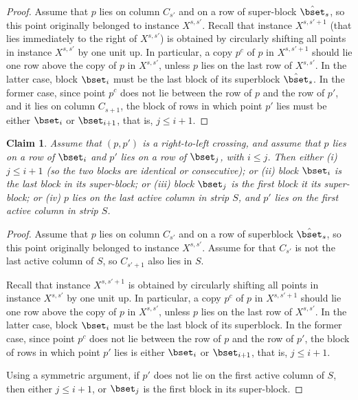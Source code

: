 \documentclass[11pt]{article}
\numberwithin{equation}{section}
\newtheorem{claim}[theorem]{Claim}
\theoremstyle{definition}
\theoremstyle{plain}
\begin{document}
\begin{proof}
Assume that $p$ lies on column $C_{s'}$ and on a row of super-block $\hat\bset_s$, so this point originally belonged to instance $X^{s,s'}$. Recall that instance $X^{s,s'+1}$  (that lies immediately to the right of $X^{s,s'}$) is obtained by circularly shifting all points in instance $X^{s,s'}$ by one unit up. In particular, a copy $p^c$ of $p$ in $X^{s,s'+1}$ should lie one row above the copy of $p$ in $X^{s,s'}$, unless $p$ lies on the last row of $X^{s,s'}$. In the latter case, block $\bset_i$ must be the last block of its superblock $\hat \bset_s$. In the former case, since point $p^c$ does not lie between the row of $p$ and the row of $p'$, and it lies on column $C_{s+1}$, the block of rows in which point $p'$ lies must be either $\bset_i$ or $\bset_{i+1}$, that is, $j\leq i+1$.
\end{proof}

\begin{claim}\label{claim: right to left crossing}
	Assume that $(p,p')$ is a right-to-left crossing, and assume that $p$ lies on a row of $\bset_i$ and $p'$ lies on a row of $\bset_j$, with $i\leq j$. Then either (i) $j\leq i+1$ (so the two blocks are identical or consecutive); or (ii) block $\bset_i$ is the last block in its super-block; or (iii) block $\bset_j$ is the first block it its super-block; or (iv) $p$ lies on the last active column in strip $S$, and $p'$ lies on the first active column in strip $S$.
\end{claim}

\begin{proof}
	Assume that $p$ lies on column $C_{s'}$ and on a row of superblock $\hat \bset_s$, so this point originally belonged to instance $X^{s,s'}$. 
	Assume for that $C_{s'}$ is not the last active column of $S$, so $C_{s'+1}$ also lies in $S$. 
	
	Recall that instance $X^{s,s'+1}$ is obtained by circularly shifting all points in instance $X^{s,s'}$ by one unit up. In particular, a copy $p^c$ of $p$ in $X^{s,s'+1}$ should lie one row above the copy of $p$ in $X^{s,s'}$, unless $p$ lies on the last row of $X^{s,s'}$. In the latter case, block $\bset_i$ must be the last block of its superblock. In the former case, since point $p^c$ does not lie between the row of $p$ and the row of $p'$, the block of rows in which point $p'$ lies is either $\bset_i$ or $\bset_{i+1}$,  that is, $j\leq i+1$.
	
	Using a symmetric argument, if $p'$ does not lie on the first active column of $S$, then either $j\leq i+1$, or $\bset_j$ is the first block in its super-block.
\end{proof}
\end{document}
